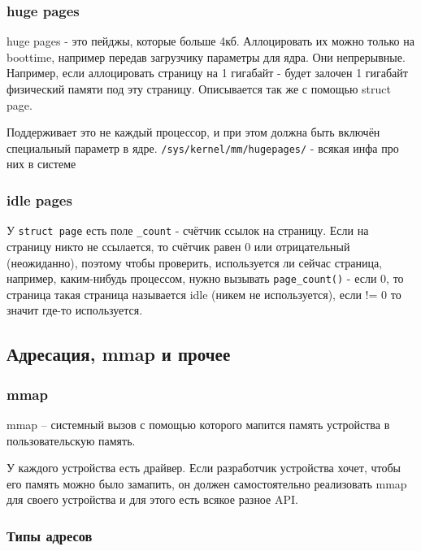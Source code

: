 \documentclass[12pt]{report}
\begin{document}
\subsubsection{huge pages}

huge pages - это пейджы, которые больше 4кб. Аллоцировать их можно только на boottime, например передав загрузчику параметры для ядра. Они непрерывные. Например, если аллоцировать страницу на 1 гигабайт - будет залочен 1 гигабайт физический памяти под эту страницу. Описывается так же с помощью struct page.

Поддерживает это не каждый процессор, и при этом должна быть включён специальный параметр в ядре. \texttt{/sys/kernel/mm/hugepages/} - всякая инфа про них в системе

\subsubsection{idle pages}

У \texttt{struct page} есть поле \texttt{\_count} - счётчик ссылок на страницу. Если на страницу никто не ссылается, то счётчик равен 0 или отрицательный (неожиданно), поэтому чтобы проверить, используется ли сейчас страница, например, каким-нибудь процессом, нужно вызывать \texttt{page\_count()} - если 0, то страница такая страница называется idle (никем не используется), если != 0 то значит где-то используется.

\subsection*{Адресация, mmap и прочее}

\subsubsection{mmap}

mmap -- системный вызов с помощью которого мапится память устройства в пользовательскую память. 

У каждого устройства есть драйвер. Если разработчик устройства хочет, чтобы его память можно было замапить, он должен самостоятельно реализовать mmap для своего устройства и для этого есть всякое разное API.

\subsubsection{Типы адресов}
\end{document}
